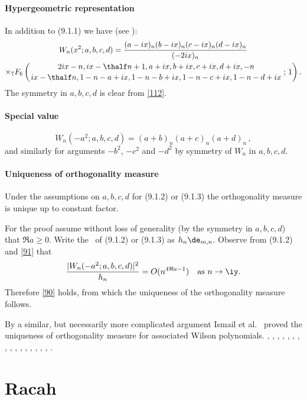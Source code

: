 \documentclass[envcountchap,graybox]{svmono}
\newcounter{rom}
\newcommand{\hyp}[5]{\mbox{}_{#1}{F}_{#2}
\left(\genfrac{}{}{0pt}{}{#3}{#4}\,;\,#5\right)}
\begin{document}
\paragraph{Hypergeometric representation}
In addition to (9.1.1) we have (see ):
\begin{multline}
W_n(x^2;a,b,c,d)
=\frac{(a-ix)_n (b-ix)_n (c-ix)_n (d-ix)_n}{(-2ix)_n}\\
\times\hyp76{2ix-n,ix-\thalf n+1,a+ix,b+ix,c+ix,d+ix,-n}
{ix-\thalf n,1-n-a+ix,1-n-b+ix,1-n-c+ix,1-n-d+ix}1.
\label{112}
\end{multline}
The symmetry in $a,b,c,d$ is clear from \eqref{112}.
%
\paragraph{Special value}
\begin{equation}
W_n(-a^2;a,b,c,d)=(a+b)_n(a+c)_n(a+d)_n\,,
\label{91}
\end{equation}
and similarly for arguments $-b^2$, $-c^2$ and
$-d^2$ by symmetry of $W_n$ in $a,b,c,d$.
%
\paragraph{Uniqueness of orthogonality measure}
Under the assumptions on $a,b,c,d$ for (9.1.2) or (9.1.3) the orthogonality
measure is unique up to constant factor.

For the proof assume without
loss of generality (by the symmetry in $a,b,c,d$) that $\Re a\ge0$.
Write the \RHS\ of (9.1.2) or (9.1.3) as $h_n\de_{m,n}$.
Observe from (9.1.2) and \eqref{91} that
\[
\frac{|W_n(-a^2;a,b,c,d)|^2}{h_n} = O(n^{4\Re a-1})\quad\hbox{as $n\to\iy$.}
\]
Therefore \eqref{90} holds, from which the uniqueness of the orthogonality
measure follows.

By a similar, but necessarily more complicated argument Ismail et al.\
 proved the uniqueness of orthogonality measure for
associated Wilson polynomials.
%
\cite{Askey89I}, \cite{AskeyWilson82}, \cite{AskeyWilson85}, \cite{AtakRahmanSuslov},
\cite{Ismail2005II}, \cite{IsmailLetMasVal}, \cite{IsmailLetValWimp90},
\cite{IsmailLetValWimp91}, \cite{Koorn85}, \cite{Koorn88}, \cite{LeskyWaibel},
\cite{Masson91}, \cite{Miller87}, \cite{MimachiII}, \cite{ValentAssche}, \cite{Wilson80}, 
\cite{Wilson91}.


\section{Racah}
\end{document}
